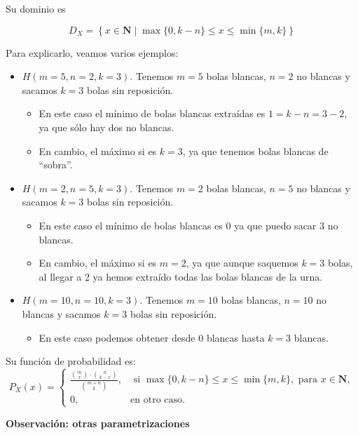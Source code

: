 \documentclass[]{book}
\providecommand{\tightlist}{%
  \setlength{\itemsep}{0pt}\setlength{\parskip}{0pt}}
\begin{document}
Su dominio es

\[D_X=\left\{x\in\mathbf{N}\mid \max\{0,k-n\}\leq  x \leq \min\{m,k\}\right\}\]

Para explicarlo, veamos varios ejemplos:

\begin{itemize}
\tightlist
\item
  \(H(m=5,n=2,k=3)\). Tenemos \(m=5\) bolas blancas, \(n=2\) no blancas y sacamos \(k=3\) bolas sin reposición.

  \begin{itemize}
  \tightlist
  \item
    En este caso el mínimo de bolas blancas extraídas es \(1=k-n=3-2\), ya que sólo hay dos no blancas.
  \item
    En cambio, el máximo si es \(k=3\), ya que tenemos bolas blancas de ``sobra''.
  \end{itemize}
\item
  \(H(m=2,n=5,k=3)\). Tenemos \(m=2\) bolas blancas, \(n=5\) no blancas y sacamos \(k=3\) bolas sin reposición.

  \begin{itemize}
  \tightlist
  \item
    En este caso el mínimo de bolas blancas es \(0\) ya que puedo sacar 3 no blancas.
  \item
    En cambio, el máximo si es \(m=2\), ya que aunque saquemos \(k=3\) bolas, al llegar a 2 ya hemos extraído todas las bolas blancas de la urna.
  \end{itemize}
\item
  \(H(m=10,n=10,k=3)\). Tenemos \(m=10\) bolas blancas, \(n=10\) no blancas y sacamos \(k=3\) bolas sin reposición.

  \begin{itemize}
  \tightlist
  \item
    En este caso podemos obtener desde \(0\) blancas hasta \(k=3\) blancas.
  \end{itemize}
\end{itemize}

Su función de probabilidad es:
\[
P_{X}(x)=\left\{
\begin{array}{ll}
\frac{\binom{m}{x}\cdot \binom{n}{k-x}}{\binom{m+n}{k}}, & \mbox{ si }
\max\{0,k-n\}\leq x \leq \min\{m,k\}, \mbox { para  } x\in \mathbf{N},\\
0,  & \mbox{en otro caso.}\end{array}\right.
\]

 \textbf{Observación: otras parametrizaciones}
\end{document}
